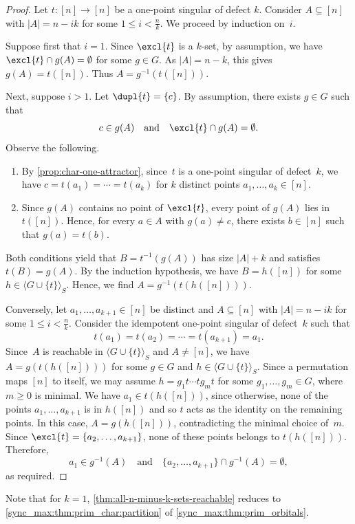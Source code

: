 \begin{proof}	
	Let $t \colon [n] \to [n]$ be a one-point singular of defect $k$.
	Consider $A \subseteq [n]$ with $|A| = n - ik$ for some $1 \le i < \frac{n}{k}$.
	We proceed by induction on~$i$.
		
	Suppose first that $i = 1$.
	Since $\excl{t}$ is a $k$-set,
	by assumption, we have $\excl{t} \cap g(A) = \emptyset$ for some $g \in G$.
	As $|A| = n - k$, this gives $g(A) = t([n])$.
	Thus $A = g^{-1}(t([n]))$.
	
	Next, suppose $i > 1$. Let $\dupl{t} = \{c\}$.
	By assumption, there exists $g \in G$ such that
	\[
	c \in g(A)
	\quad\text{and}\quad
	\excl{t} \cap g(A) = \emptyset.
	\]
	Observe the following.
    
    \begin{enumerate}
    \item By \cref{prop:char-one-attractor}, since~$t$ is a one-point singular of defect~$k$,
    we have $c = t(a_1) = \cdots = t(a_{k})$ for $k$ distinct points $a_1, \ldots, a_k \in [n]$.
      
    \item 
    Since $g(A)$ contains no point of $\excl{t}$,
    every point of $g(A)$ lies in $t([n])$.
    Hence, for every $a \in A$ with $g(a) \neq c$,
    there exists $b \in [n]$ such that
    $g(a) = t(b)$.
    \end{enumerate}
    Both conditions yield that $B = t^{-1}(g(A))$ has size $|A| + k$
	and satisfies $t(B) = g(A)$.
	By the induction hypothesis, we have $B = h([n])$
	for some $h \in \langle G \cup \{t\} \rangle_S$.
	Hence, we find $A = g^{-1}(t(h([n])))$.		
	
	Conversely, let $a_1, \ldots, a_{k+1} \in [n]$ be distinct and 
	$A \subseteq [n]$ with $|A| = n - ik$ for some $1 \le i < \frac{n}{k}$.
	Consider the idempotent one-point singular of defect~$k$
	such that
	\[
	t(a_1)=t(a_2)=\cdots=t(a_{k+1})=a_1.
	\]
	Since~$A$ is reachable in $\langle G \cup \{t\} \rangle_S$
	and $A \ne [n]$,
	we have $A = g(t(h([n])))$
	for some $g \in G$ and $h \in \langle G \cup \{t\} \rangle_S$.
 	Since a permutation maps $[n]$ to itself, 	
 	we may assume $h = g_1 t \cdots t g_m t$
	for some $g_1, \ldots, g_m \in G$, where $m \ge 0$ is minimal.	
	We have $a_1 \in t(h([n]))$, since otherwise, none
	of the points $a_1, \ldots, a_{k+1}$ is in $h([n])$
	and so $t$ acts as the identity on the remaining points.
	In this case, $A = g(h([n]))$, contradicting the minimal
	choice of~$m$.
	Since $\excl{t} = \{a_2, \ldots, a_{k+1}\}$,
	none of these points belongs to $t(h([n]))$.
	Therefore,
	\[
	a_1\in g^{-1}(A)
	\quad\text{and}\quad
	\{a_2,\ldots,a_{k+1}\}\cap g^{-1}(A)=\emptyset,
	\]
	as required.
\end{proof}

Note that for $k=1$, \cref{thm:all-n-minus-k-sets-reachable}
reduces to \cref{sync_max:thm:prim_char:partition}
of \cref{sync_max:thm:prim_orbitals}.